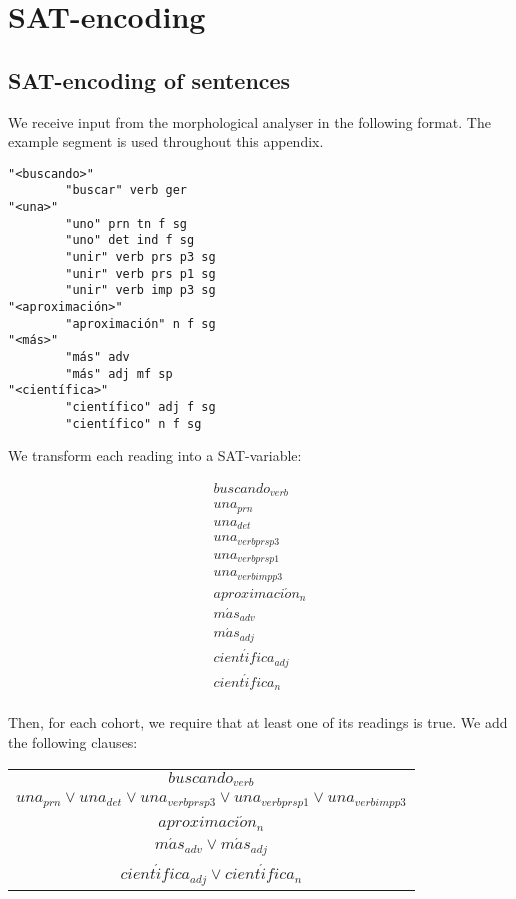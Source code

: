 \def\buscandoV{buscando_{verb}}
\def\unaPrn{una_{prn}}

\appendix
\chapter{SAT-encoding}

\section{SAT-encoding of sentences}

We receive input from the morphological analyser in the following format.
The example segment is used throughout this appendix.

\begin{verbatim}
"<buscando>"
        "buscar" verb ger
"<una>"
        "uno" prn tn f sg
        "uno" det ind f sg
        "unir" verb prs p3 sg
        "unir" verb prs p1 sg
        "unir" verb imp p3 sg
"<aproximación>"
        "aproximación" n f sg
"<más>"
        "más" adv
        "más" adj mf sp
"<científica>"
        "científico" adj f sg
        "científico" n f sg
\end{verbatim}

We transform each reading into a SAT-variable:


\begin{multline}
\buscandoV \\
\unaPrn \\
una_{det} \\
una_{verb prs p3} \\
una_{verb prs p1} \\
una_{verb imp p3} \\
aproximaci\acute{o}n_n \\
m\acute{a}s_{adv} \\
m\acute{a}s_{adj} \\
cient\acute{i}fica_{adj} \\
cient\acute{i}fica_n \\
\end{multline}

Then, for each cohort, we require that at least one of its readings is true. We add the following clauses:

\begin{centering}
\begin{tabular}{c}
$buscando_{verb}$ \\
$una_{prn} \vee una_{det} \vee una_{verb prs p3} \vee una_{verb prs p1} \vee una_{verb imp p3}$ \\
$aproximaci\acute{o}n_n$ \\
$m\acute{a}s_{adv} \vee m\acute{a}s_{adj}$ \\
$cient\acute{i}fica_{adj}\vee cient\acute{i}fica_n$ \\
\end{tabular}
\end{centering}

